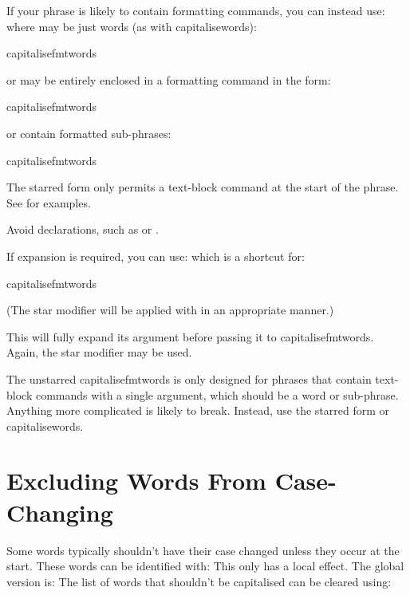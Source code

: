 \documentclass[titlepage=false,oneside,
 fontsize=12pt,captions=tableheading]{scrbook}
\begin{document}
If your phrase is likely to contain formatting commands, you can instead use:
where  may be just words (as with \gls{capitalisewords}):
\begin{compactcodebox}
\gls{capitalisefmtwords}
\end{compactcodebox}
or may be entirely enclosed in a formatting command in the form:
\begin{compactcodebox}
\gls{capitalisefmtwords}
\end{compactcodebox}
or contain formatted sub-phrases:
\begin{compactcodebox}
\gls{capitalisefmtwords}
\end{compactcodebox}
The starred form only permits a text-block command at the
start of the phrase. See  for
examples.

\begin{warning}
Avoid declarations, such as  or .
\end{warning}

If expansion is required, you can use:
which is a shortcut for:
\begin{compactcodebox}
\gls{capitalisefmtwords}
\end{compactcodebox}
(The star modifier will be applied with 
 in an appropriate manner.)

This will fully expand its argument before passing it to
\gls{capitalisefmtwords}. Again, the star modifier may be used.

\begin{important}
The unstarred \gls{capitalisefmtwords} is only designed for phrases that contain
text-block commands with a single
argument, which should be a word or sub-phrase. Anything
more complicated is likely to break. Instead, use the
starred form or \gls{capitalisewords}.
\end{important}

\section{Excluding Words From Case-Changing}
\label{sec:nocap}

Some words typically shouldn't have their case changed unless they
occur at the start. These words can be identified with:
This only has a local effect. The global version is:
The list of words that shouldn't be capitalised can be cleared
using:
\end{document}
